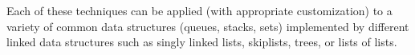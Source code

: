  Each of these techniques can be applied (with appropriate customization) to a
variety of common data structures (queues, stacks, sets) implemented by different linked data structures such as singly linked lists, skiplists, trees, or lists of lists. 
%
%
%
%
%
%
%
\vspace{1cm}




